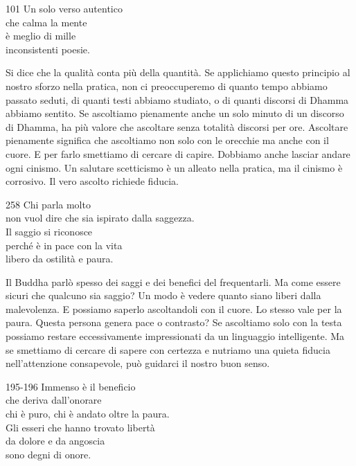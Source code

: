 
\begin{dhpVerse}{101}
\label{dhp-101}
Un solo verso autentico\\
che calma la mente\\
\`{e} meglio di mille\\
inconsistenti poesie.
\end{dhpVerse}

\begin{dhpRefl}
Si dice che la qualit\`{a} conta più della quantit\`{a}. Se applichiamo questo principio al nostro sforzo nella pratica, non ci preoccuperemo di quanto tempo abbiamo passato seduti, di quanti testi abbiamo studiato, o di quanti discorsi di Dhamma abbiamo sentito. Se ascoltiamo pienamente anche un solo minuto di un discorso di Dhamma, ha più valore che ascoltare senza totalit\`{a} discorsi per ore. Ascoltare pienamente significa che ascoltiamo non solo con le orecchie ma anche con il cuore. E per farlo smettiamo di cercare di capire. Dobbiamo anche lasciar andare ogni cinismo. Un salutare scetticismo \`{e} un alleato nella pratica, ma il cinismo \`{e} corrosivo. Il vero ascolto richiede fiducia.
\end{dhpRefl}


\begin{dhpVerse}{258}
\label{dhp-258}
Chi parla molto\\
non vuol dire che sia ispirato dalla saggezza.\\
Il saggio si riconosce\\
perch\'{e} \`{e} in pace con la vita\\
libero da ostilit\`{a} e paura.
\end{dhpVerse}

\begin{dhpRefl}
Il Buddha parl\`{o} spesso dei saggi e dei benefici del frequentarli. Ma come essere sicuri che qualcuno sia saggio? Un modo \`{e} vedere quanto siano liberi dalla malevolenza. E possiamo saperlo ascoltandoli con il cuore. Lo stesso vale per la paura. Questa persona genera pace o contrasto? Se ascoltiamo solo con la testa possiamo restare eccessivamente impressionati da un linguaggio intelligente. Ma se smettiamo di cercare di sapere con certezza e nutriamo una quieta fiducia nell'attenzione consapevole, pu\`{o} guidarci il nostro buon senso.
\end{dhpRefl}


\begin{dhpVerse}{195-196}
\label{dhp-195}\label{dhp-196}
Immenso \`{e} il beneficio\\
che deriva dall'onorare\\
chi \`{e} puro, chi \`{e} andato oltre la paura.\\
Gli esseri che hanno trovato libert\`{a}\\
da dolore e da angoscia\\
sono degni di onore.
\end{dhpVerse}


